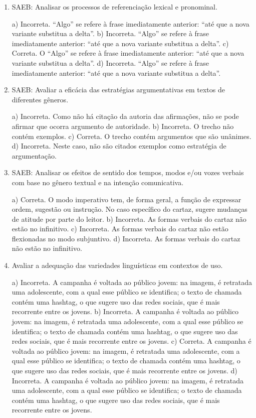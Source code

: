\begin{enumerate}
\item
SAEB: Analisar os processos de referenciação lexical e pronominal.

a) Incorreta. ``Algo'' se refere à frase imediatamente anterior: ``até que a
nova variante substitua a delta''.
b) Incorreta. ``Algo'' se refere à frase imediatamente anterior: ``até que a
nova variante substitua a delta''.
c) Correta. O ``Algo'' se refere à frase imediatamente anterior: ``até que a
nova variante substitua a delta''.
d) Incorreta. ``Algo'' se refere à frase imediatamente anterior: ``até que a
nova variante substitua a delta''.

\item
SAEB: Avaliar a eficácia das estratégias argumentativas em textos de
diferentes gêneros.

a) Incorreta. Como não há citação da autoria das afirmações, não se 
pode afirmar que ocorra argumento de autoridade.
b) Incorreta. O trecho não contém exemplos.
c) Correta. O trecho contém argumentos que são unânimes.
d) Incorreta. Neste caso, não são citados exemplos como estratégia de
argumentação.

\item
SAEB: Analisar os efeitos de sentido dos tempos, modos e/ou
vozes verbais com base no gênero textual e na intenção comunicativa.
 
a) Correta. O modo imperativo tem, de forma geral, a função de expressar
ordem, sugestão ou instrução. No caso específico do cartaz, sugere mudanças
de atitude por parte do leitor.
b) Incorreta. As formas verbais do cartaz não estão no infinitivo.
c) Incorreta. As formas verbais do cartaz não estão flexionadas no modo subjuntivo.
d) Incorreta. As formas verbais do cartaz não estão no infinitivo.

\item
Avaliar a adequação das variedades linguísticas em contextos de uso.

a) Incorreta. A campanha é voltada ao público jovem: na imagem, é retratada 
uma adolescente, com a qual esse público se identifica; o texto de 
chamada contém uma hashtag, o que sugere uso das redes sociais, que é mais
recorrente entre os jovens.  
b) Incorreta. A campanha é voltada ao público jovem: na imagem, é retratada 
uma adolescente, com a qual esse público se identifica; o texto de 
chamada contém uma hashtag, o que sugere uso das redes sociais, que é mais
recorrente entre os jovens.  
c) Correta. A campanha é voltada ao público jovem: na imagem, é retratada 
uma adolescente, com a qual esse público se identifica; o texto de 
chamada contém uma hashtag, o que sugere uso das redes sociais, que é mais
recorrente entre os jovens.  
d) Incorreta. A campanha é voltada ao público jovem: na imagem, é retratada 
uma adolescente, com a qual esse público se identifica; o texto de 
chamada contém uma hashtag, o que sugere uso das redes sociais, que é mais
recorrente entre os jovens.

\end{enumerate}

